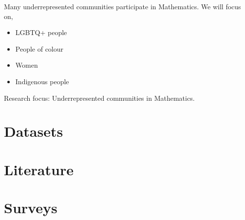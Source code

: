 \documentclass[autowc]{CUP-JNL-PPS}
\begin{document}
Many underrepresented communities participate in Mathematics.
We will focus on,
\begin{itemize}
    \item LGBTQ+ people
    \item People of colour
    \item Women
    \item Indigenous people
\end{itemize}

Research focus: Underrepresented communities in Mathematics.

\section{Datasets}
\section{Literature}
\section{Surveys}

\end{document}
